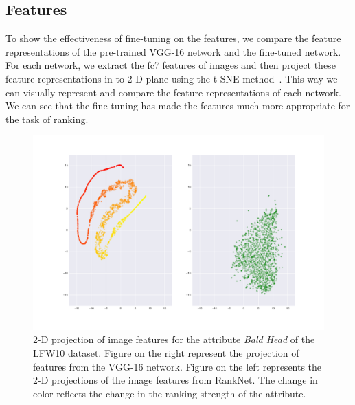 \documentclass[10pt,twocolumn,letterpaper]{article}
\begin{document}
\subsection{Features}
To show the effectiveness of fine-tuning on the features, we compare the feature representations of the pre-trained VGG-16 network and the fine-tuned network. For each network, we extract the fc7 features of images and then project these feature representations in to 2-D plane using the t-SNE method~\cite{van2008visualizing}. This way we can visually represent and compare the feature representations of each network.
We can see that the fine-tuning has made the features much more appropriate for the task of ranking.

\begin{figure}
    \centering
    \includegraphics[width=18cm]{att0.pdf}
    \caption{2-D projection of image features for the attribute \textit{Bald Head} of the LFW10 dataset. Figure on the right represent the projection of features from the VGG-16 network. Figure on the left represents the 2-D projections of the image features from RankNet. The change in color reflects the change in the ranking strength of the attribute.}
    \label{fig:tsne_lfw_att0}
\end{figure}
\end{document}
